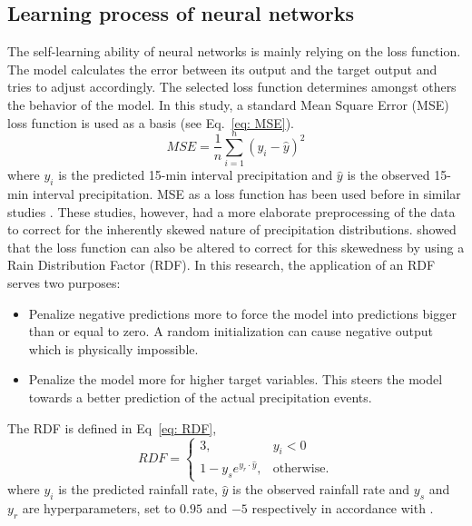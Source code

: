 \documentclass[twocolumn, 10pt, a4paper]{memoir}
\begin{document}
	\subsection{Learning process of neural networks} \label{sec: Learning NN}
	The self-learning ability of neural networks is mainly relying on the loss function. The model calculates the error between its output and the target output and tries to adjust accordingly. The selected loss function determines amongst others the behavior of the model. In this study, a standard Mean Square Error (MSE) loss function is used as a basis (see Eq.~\ref{eq: MSE}).
	\begin{equation} \label{eq: MSE}
		MSE = \frac{1}{n} \sum_{i=1}^{n} (y_i - \hat{y})^2
	\end{equation}
	where ${y_i}$ is the predicted 15-min interval precipitation and $\hat{y}$ is the observed 15-min interval precipitation.
	MSE as a loss function has been used before in similar studies \cite{Pudashine2020, Diba2021}. These studies, however, had a more elaborate preprocessing of the data to correct for the inherently skewed nature of precipitation distributions.  showed that the loss function can also be altered to correct for this skewedness by using a Rain Distribution Factor (RDF). In this research, the application of an RDF serves two purposes:
	
	\begin{itemize}
		\item Penalize negative predictions more to force the model into predictions bigger than or equal to zero. A random initialization can cause negative output which is physically impossible.
		\item Penalize the model more for higher target variables. This steers the model towards a better prediction of the actual precipitation events.
	\end{itemize}
	\vspace{3mm}
	The RDF is defined in Eq~\ref{eq: RDF},
	\begin{equation}
		\label{eq: RDF}
		RDF=\begin{cases}
			3, & y_i < 0\\
			1-y_s e^{y_r\cdot{}\hat{y}}, & \text{otherwise}.
		\end{cases}
	\end{equation}
	where $y_i$ is the predicted rainfall rate, $\hat{y}$ is the observed rainfall rate and $y_s$ and $y_r$ are hyperparameters, set to $0.95$ and $-5$ respectively in accordance with .
	
\end{document}
